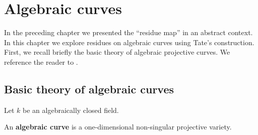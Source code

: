 \chapter{Algebraic curves}\label{ch:algebraic-curves}
In the preceding chapter we presented the ``residue map'' in an abstract context. In this chapter we explore residues on algebraic curves using Tate's construction. First, we recall briefly the basic theory of algebraic projective curves. We reference the reader to \cite{curves}. 
\section{Basic theory of algebraic curves}
Let $k$ be an algebraically closed field.
\begin{definition}\label{def:algebraic-curve}
	An \textbf{algebraic curve} is a one-dimensional non-singular projective variety.
\end{definition}

